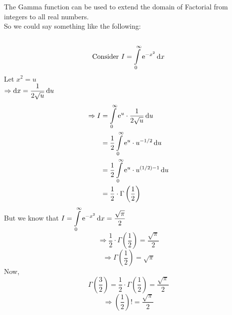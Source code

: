 \documentclass[14]{article}
\theoremstyle{definition}
\theoremstyle{case}
\begin{document}
\paragraph{}\text{}\\
The Gamma function can be used to extend the domain of Factorial from integers to all real numbers.\\
So we could say something like the following:\\\\
\[\text{Consider } I = \int\limits_0^{\infty} {\rm e}^{-x^2} \dif x\]
Let $x^2 = u$\\
$\Rightarrow \dif x =\dfrac1{2\sqrt u} \dif u$
\begin{align*}
\Rightarrow I &= \int\limits_0^{\infty} {\rm e}^u 
\cdot \dfrac1{2 \sqrt u} \dif u\\
&= \dfrac12 \int\limits_0^{\infty} {\rm e}^u \cdot u^{-1/2} \dif u\\
&= \dfrac12 \int\limits_0^{\infty} {\rm e}^u \cdot u^{(1/2) -1} \dif u\\
&= \dfrac12 \cdot \Gamma\left(\dfrac12\right)
\end{align*}
But we know that $I = \displaystyle\int\limits_0^{\infty} {\rm e}^{-x^2} \dif x = \dfrac{\sqrt{\pi}}{2}$
\[\Rightarrow \dfrac12 \cdot \Gamma\left( \dfrac12 \right) =\dfrac{\sqrt{\pi}}{2}\]
\[\Rightarrow \Gamma\left( \dfrac12 \right) = \sqrt{\pi}\]
Now,
\[\Gamma\left( \dfrac32 \right) = \dfrac12 \cdot \Gamma\left(\dfrac12\right) = \dfrac{\sqrt{\pi}}2\]
\[\Rightarrow \left( \dfrac12 \right)! = \dfrac{\sqrt{\pi}}{2}\]
\pagebreak
\end{document}

